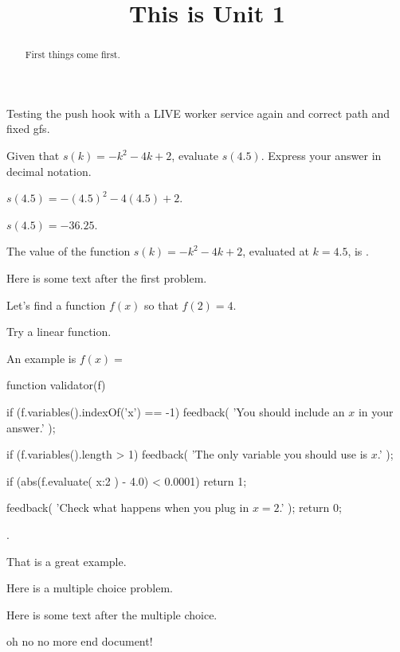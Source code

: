 \documentclass{ximera}
\title{This is Unit 1}
\begin{document}
\begin{abstract}
  First things come first.
\end{abstract}


Testing the push hook with a LIVE worker service again and correct path and fixed gfs.

\begin{exercise}
Given that $s(k)=-k^2-4 k+2$, evaluate $s(4.5)$. Express your answer in decimal notation.
\begin{solution}
\begin{hint}
$s(4.5)=-(4.5)^2-4 (4.5)+2$.
\end{hint}
\begin{hint}
$s(4.5)=-36.25$.
\end{hint}
The value of the function $s(k)=-k^2-4 k+2$, evaluated at $k=4.5$, is .
\end{solution}

Here is some text after the first problem.
\end{exercise}


\begin{exercise}
Let's find a function $f(x)$ so that $f(2) = 4$.

\begin{solution}
\begin{hint}
Try a linear function.
\end{hint}
An example is $f(x) = $ \begin{expression-answer}
  function validator(f) {
    if (f.variables().indexOf('x') == -1) {
      feedback( 'You should include an $x$ in your answer.' );
    }

    if (f.variables().length > 1) {
      feedback( 'The only variable you should use is $x$.' );
    }

    if (abs(f.evaluate( {x:2} ) - 4.0) < 0.0001)
      return 1;

    feedback( 'Check what happens when you plug in $x=2$.' );
    return 0;
  }
\end{expression-answer}.
\end{solution}

That is a great example.
\end{exercise}

\begin{exercise}
  Here is a multiple choice problem.

  \begin{solution}
    \begin{multiple-choice}
    \end{multiple-choice}
  \end{solution}

  Here is some text after the multiple choice.
\end{exercise}

oh no no more end document!
\end{document}
